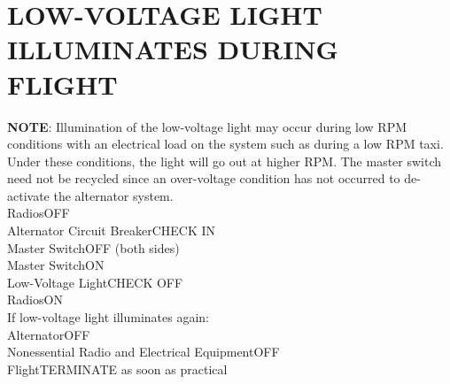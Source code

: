 \documentclass{article}
\begin{document}
\section*{LOW-VOLTAGE LIGHT ILLUMINATES DURING FLIGHT}
\centering \textbf{NOTE}:
Illumination of the low-voltage light may occur during low RPM conditions with an electrical load on the system such as during a low RPM taxi. Under these conditions, the light will go out at higher RPM. The master switch need not be recycled since an over-voltage condition has not occurred to de-activate the alternator system.\\
Radios\dotfill OFF\\
Alternator Circuit Breaker\dotfill CHECK IN\\
Master Switch\dotfill OFF (both sides)\\
Master Switch\dotfill ON\\
Low-Voltage Light\dotfill CHECK OFF\\
Radios\dotfill ON\\
If low-voltage light illuminates again:\\
Alternator\dotfill OFF\\
Nonessential Radio and Electrical Equipment\dotfill OFF\\
Flight\dotfill TERMINATE as soon as practical
\end{document}
